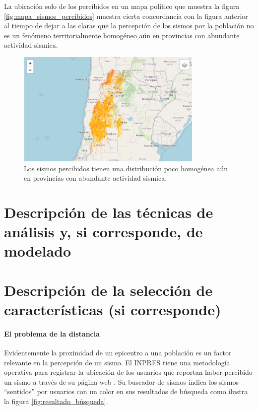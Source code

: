 \documentclass[a4paper]{report}
\begin{document}
La ubicación solo de los percibidos en un mapa político que muestra la figura \ref{fig:mapa_sismos_percibidos} muestra cierta concordancia con la figura anterior al tiempo de dejar a las claras que la percepción de los sismos por la población no es un fenómeno territorialmente homogéneo aún en provincias con abundante actividad sismica.
\begin{figure}[h]
\centering
\includegraphics[width=0.8\textwidth]{mapa_percibidos.png}
\caption{Los sismos percibidos tienen una distribución poco homogénea aún en provincias con abundante actividad sismica.}
\label{fig:mapa_percibidos}
\end{figure}




\section{Descripción de las técnicas de análisis y, si corresponde, de modelado}



\section{Descripción de la selección de características (si corresponde)}

\paragraph{El problema de la distancia}
Evidentemente la proximidad de un epicentro a una población es un factor relevante en la percepción de un sismo.
El INPRES tiene una metodología operativa para registrar la ubicación de los usuarios que reportan haber percibido un sismo a través de su página web \cite{noauthor_acerca_nodate}.
Su buscador de sismos indica los sismos ``sentidos'' por usuarios con un color en sus resultados de búsqueda como ilustra la figura \ref{fig:resultado_búsqueda}.
\end{document}
